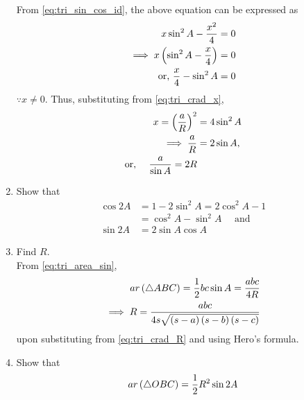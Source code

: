 \begin{enumerate}[label=\thesection.\arabic*.,ref=\thesection.\theenumi]
%
From \eqref{eq:tri_sin_cos_id}, the above equation can be expressed as
%
\begin{align}
x\sin^2 A - \frac{x^2}{4} &= 0
\\
\implies x\left(\sin^2 A - \frac{x}{4}\right) &= 0
\\
\text{or, } \frac{x}{4} - \sin^2 A &=0
\end{align}
%
$\because x \ne 0$.  Thus, substituting from \eqref{eq:tri_crad_x},
\begin{align}
x = \left(\frac{a}{R}\right)^2 &= 4 \sin^2 A 
\\
\implies \frac{a}{R} &= 2\sin A,
\\
\text{or, }\quad \frac{a}{\sin A} = 2R
\end{align}
%
\item Show that 
\label{eq:cos2x}
\begin{align}
\cos 2A &= 1 -2\sin^2 A = 2\cos^2 A - 1 
\\
&= \cos^2 A - \sin^2A \quad \text{ and }
\\
\sin 2A &= 2 \sin A \cos A
\label{eq:sin2x}
\end{align}
\item Find $R$.
\\
\solution From \eqref{eq:tri_area_sin}, 
\begin{align}
ar\left(\triangle ABC\right) = \frac{1}{2}bc \sin A = \frac{abc}{4R}&
\\
\implies R = \frac{abc}{4s\sqrt{\left(s-a\right)\left(s-b\right)\left(s-c\right)}}&
\end{align}
%
upon substituting from \eqref{eq:tri_crad_R} and using Hero's formula.
%
\item Show that
%
\begin{align}
\label{eq:circ_area_chord}
ar\brak{\triangle OBC} = \frac{1}{2}R^2\sin 2A
\end{align}
%
\iffalse
\item Find the circumradius of $\triangle ABC$ for $a = 5, b = 6, c = 4$.
%
\\
\solution The following python code calculates the circumradius
\begin{lstlisting}
codes/circle/tri_cradius.py
\end{lstlisting}
\fi


\end{enumerate}
